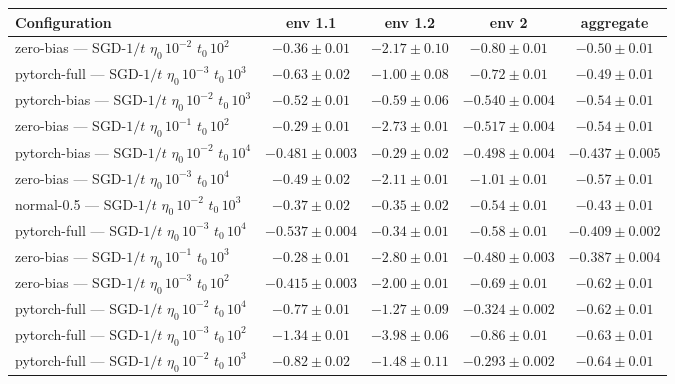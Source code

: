 \begin{table}[H]
\centering
\scriptsize
\setlength{\tabcolsep}{4pt}
\renewcommand{\arraystretch}{1.0}
\begin{tabular}{@{}>{\raggedright\arraybackslash}p{5.2cm} cccc@{}}
\toprule
\textbf{Configuration} & \textbf{env 1.1} & \textbf{env 1.2} & \textbf{env 2} & \textbf{aggregate} \\
\midrule
zero-bias --- SGD-$1/t$ $\eta_0\,10^{-2}$ $t_0\,10^{2}$ & $-0.36 \pm 0.01$ & $-2.17 \pm 0.10$ & $-0.80 \pm 0.01$ & \textbf{$-0.50 \pm 0.01$} \\
pytorch-full --- SGD-$1/t$ $\eta_0\,10^{-3}$ $t_0\,10^{3}$ & $-0.63 \pm 0.02$ & $-1.00 \pm 0.08$ & $-0.72 \pm 0.01$ & \underline{$-0.49 \pm 0.01$} \\
pytorch-bias --- SGD-$1/t$ $\eta_0\,10^{-2}$ $t_0\,10^{3}$ & $-0.52 \pm 0.01$ & $-0.59 \pm 0.06$ & $-0.540 \pm 0.004$ & $-0.54 \pm 0.01$ \\
zero-bias --- SGD-$1/t$ $\eta_0\,10^{-1}$ $t_0\,10^{2}$ & $-0.29 \pm 0.01$ & $-2.73 \pm 0.01$ & $-0.517 \pm 0.004$ & $-0.54 \pm 0.01$ \\
pytorch-bias --- SGD-$1/t$ $\eta_0\,10^{-2}$ $t_0\,10^{4}$ & $-0.481 \pm 0.003$ & $-0.29 \pm 0.02$ & \textbf{$-0.498 \pm 0.004$} & $-0.437 \pm 0.005$ \\
zero-bias --- SGD-$1/t$ $\eta_0\,10^{-3}$ $t_0\,10^{4}$ & \underline{$-0.49 \pm 0.02$} & $-2.11 \pm 0.01$ & $-1.01 \pm 0.01$ & $-0.57 \pm 0.01$ \\
normal-0.5 --- SGD-$1/t$ $\eta_0\,10^{-2}$ $t_0\,10^{3}$ & $-0.37 \pm 0.02$ & $-0.35 \pm 0.02$ & $-0.54 \pm 0.01$ & $-0.43 \pm 0.01$ \\
pytorch-full --- SGD-$1/t$ $\eta_0\,10^{-3}$ $t_0\,10^{4}$ & $-0.537 \pm 0.004$ & $-0.34 \pm 0.01$ & $-0.58 \pm 0.01$ & $-0.409 \pm 0.002$ \\
zero-bias --- SGD-$1/t$ $\eta_0\,10^{-1}$ $t_0\,10^{3}$ & $-0.28 \pm 0.01$ & $-2.80 \pm 0.01$ & $-0.480 \pm 0.003$ & $-0.387 \pm 0.004$ \\
zero-bias --- SGD-$1/t$ $\eta_0\,10^{-3}$ $t_0\,10^{2}$ & $-0.415 \pm 0.003$ & $-2.00 \pm 0.01$ & $-0.69 \pm 0.01$ & $-0.62 \pm 0.01$ \\
pytorch-full --- SGD-$1/t$ $\eta_0\,10^{-2}$ $t_0\,10^{4}$ & $-0.77 \pm 0.01$ & $-1.27 \pm 0.09$ & $-0.324 \pm 0.002$ & $-0.62 \pm 0.01$ \\
pytorch-full --- SGD-$1/t$ $\eta_0\,10^{-3}$ $t_0\,10^{2}$ & $-1.34 \pm 0.01$ & $-3.98 \pm 0.06$ & $-0.86 \pm 0.01$ & $-0.63 \pm 0.01$ \\
pytorch-full --- SGD-$1/t$ $\eta_0\,10^{-2}$ $t_0\,10^{3}$ & $-0.82 \pm 0.02$ & $-1.48 \pm 0.11$ & $-0.293 \pm 0.002$ & $-0.64 \pm 0.01$ \\

\end{tabular}
\end{table}
